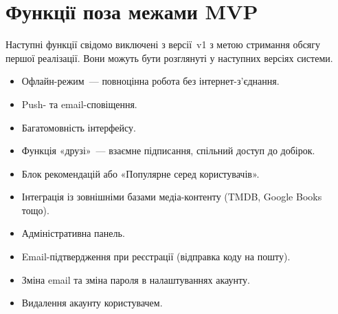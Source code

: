 \section{Функції поза межами MVP}
\label{sec:poza-mvp}

Наступні функції свідомо виключені з версії~v1 з метою стримання обсягу першої реалізації. Вони можуть бути розглянуті у наступних версіях системи. 

\begin{itemize}
  \item Офлайн-режим~--- повноцінна робота без інтернет-з'єднання.
  \item Push- та email-сповіщення.
  \item Багатомовність інтерфейсу.
  \item Функція «друзі»~--- взаємне підписання, спільний доступ до добірок.
  \item Блок рекомендацій або «Популярне серед користувачів».
  \item Інтеграція із зовнішніми базами медіа-контенту (TMDB, Google Books тощо).
  \item Адміністративна панель.
  \item Email-підтвердження при реєстрації (відправка коду на пошту).
  \item Зміна email та зміна пароля в налаштуваннях акаунту.
  \item Видалення акаунту користувачем.
\end{itemize}

